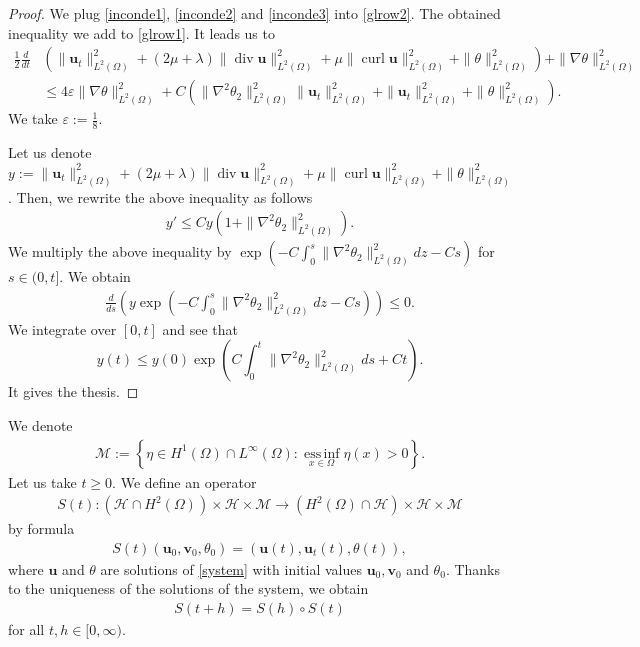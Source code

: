 \documentclass[11pt]{article}
\numberwithin{equation}{section}
\theoremstyle{plain}
\newcommand\bb[1]{\mathbf{#1}}
\newcommand{\tn}{\Omega}
\newcommand{\htwo}{H^2(\Omega)}
\renewcommand{\hom}{H^1(\tn)}
\newcommand{\ld}{L^2(\Omega)}
\newcommand{\ul}{\frac{1}{2}}
\newcommand{\ddt}{\frac{d}{dt}}
\renewcommand{\div}{\operatorname{div}}
\DeclareMathOperator{\curl}{curl}
\let \epsilon\varepsilon
\newcommand{\M}{\mathcal{M}}
\newcommand{\wspnd}{2\mu+\lambda}
\newcommand{\bu}{\bb{u}}
\renewcommand{\H}{\mathcal{H}}
\begin{document}
\begin{proof}
We plug \eqref{inconde1}, \eqref{inconde2} and \eqref{inconde3} into \eqref{glrow2}. The obtained inequality we add to \eqref{glrow1}. It leads us to
\begin{align*}
\ul\ddt&\left(\|\bu_t\|^2_{\ld}+(\wspnd)\|\div \bu\|_{\ld}^2+\mu\|\curl \bu\|_{\ld}^2+\|\theta\|^2_{\ld}\right)+\|\nabla\theta\|_{\ld}^2
\\ &\leq4\epsilon\|\nabla\theta\|_{\ld}^2+ C(\|\nabla^2\theta_2\|_{\ld}^2\|\bu_t\|_{\ld}^2+\|\bu_t\|_{\ld}^2+\|\theta\|_{\ld}^2).
\end{align*}
We take $\epsilon:=\frac18$.

Let us denote $y:=\|\bu_t\|^2_{\ld}+(\wspnd)\|\div \bu\|_{\ld}^2+\mu\|\curl \bu\|_{\ld}^2+\|\theta\|^2_{\ld}$. Then, we rewrite the above inequality as follows
\begin{align*}
y'\leq C y(1+\|\nabla^2\theta_2\|_{\ld}^2).
\end{align*}
We multiply the above inequality by $\operatorname{exp}\left(-C\int_0^s\|\nabla^2\theta_2\|_{\ld}^2dz-Cs\right)$ for $s\in(0,t]$. We obtain
\begin{align*}
\frac{d}{ds}\left(y \operatorname{exp}\left(-C\int_0^s\|\nabla^2\theta_2\|_{\ld}^2dz-Cs\right)\right)\leq 0.
\end{align*}
We integrate over $[0,t]$ and see that
$$
y(t)\leq y(0)\operatorname{exp}\left(C\int_0^t\|\nabla^2\theta_2\|_{\ld}^2ds+Ct\right).
$$
It gives the thesis.
\end{proof}

We denote
\begin{align*}
\M:=\left\{\eta\in \hom\cap L^{\infty}(\Omega)\colon \operatorname*{ess\, inf}_{x\in\tn}\eta(x)>0\right\}.
\end{align*}
Let us take $t\geq 0$. We define an operator
\begin{align*}
S(t):\left(\H\cap\htwo\right)\times\H\times\M\to \left(\htwo\cap\H\right)\times\H\times\M
\end{align*}
by formula
\begin{align*}
S(t)(\bu_0,\bb v_0,\theta_0)=(\bu(t),\bu_t(t),\theta(t)),
\end{align*}
where $\bu$ and $\theta$ are solutions of \eqref{system} with initial values $\bu_0, \bb v_0$ and $\theta_0$. Thanks to the uniqueness of the solutions of the system, we obtain
\begin{align*}
S(t+h)=S(h)\circ S(t)
\end{align*}
for all $t,h\in [0,\infty)$.
\end{document}
